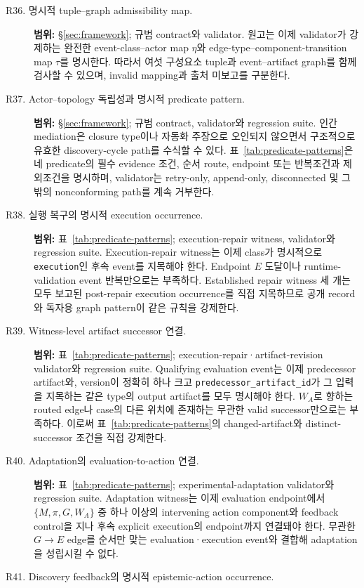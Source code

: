\documentclass[11pt]{article}
\begin{document}
\begin{description}
  \item[R36. 명시적 tuple--graph admissibility map.]
  \textbf{범위:} §\ref{sec:framework}; 규범 contract와 validator.
  원고는 이제 validator가 강제하는 완전한 event-class--actor map $\eta$와 edge-type--component-transition map $\tau$를 명시한다. 따라서 여섯 구성요소 tuple과 event--artifact graph를 함께 검사할 수 있으며, invalid mapping과 출처 미보고를 구분한다.
  \item[R37. Actor--topology 독립성과 명시적 predicate pattern.]
  \textbf{범위:} §\ref{sec:framework}; 규범 contract, validator와 regression suite.
  인간 mediation은 closure type이나 자동화 주장으로 오인되지 않으면서 구조적으로 유효한 discovery-cycle path를 수식할 수 있다. 표~\ref{tab:predicate-patterns}은 네 predicate의 필수 evidence 조건, 순서 route, endpoint 또는 반복조건과 제외조건을 명시하며, validator는 retry-only, append-only, disconnected 및 그 밖의 nonconforming path를 계속 거부한다.
  \item[R38. 실행 복구의 명시적 execution occurrence.]
  \textbf{범위:} 표~\ref{tab:predicate-patterns}; execution-repair witness, validator와 regression suite.
  Execution-repair witness는 이제 class가 명시적으로 \texttt{execution}인 후속 event를 지목해야 한다. Endpoint $E$ 도달이나 runtime-validation event 반복만으로는 부족하다. Established repair witness 세 개는 모두 보고된 post-repair execution occurrence를 직접 지목하므로 공개 record와 독자용 graph pattern이 같은 규칙을 강제한다.
  \item[R39. Witness-level artifact successor 연결.]
  \textbf{범위:} 표~\ref{tab:predicate-patterns}; execution-repair·artifact-revision validator와 regression suite.
  Qualifying evaluation event는 이제 predecessor artifact와, version이 정확히 하나 크고 \texttt{predecessor\_artifact\_id}가 그 입력을 지목하는 같은 type의 output artifact를 모두 명시해야 한다. $W_A$로 향하는 routed edge나 case의 다른 위치에 존재하는 무관한 valid successor만으로는 부족하다. 이로써 표~\ref{tab:predicate-patterns}의 changed-artifact와 distinct-successor 조건을 직접 강제한다.
  \item[R40. Adaptation의 evaluation-to-action 연결.]
  \textbf{범위:} 표~\ref{tab:predicate-patterns}; experimental-adaptation validator와 regression suite.
  Adaptation witness는 이제 evaluation endpoint에서 $\{M,\pi,G,W_A\}$ 중 하나 이상의 intervening action component와 feedback control을 지나 후속 explicit execution의 endpoint까지 연결돼야 한다. 무관한 $G\!\to\!E$ edge를 순서만 맞는 evaluation·execution event와 결합해 adaptation을 성립시킬 수 없다.
  \item[R41. Discovery feedback의 명시적 epistemic-action occurrence.]

\end{description}
\end{document}
